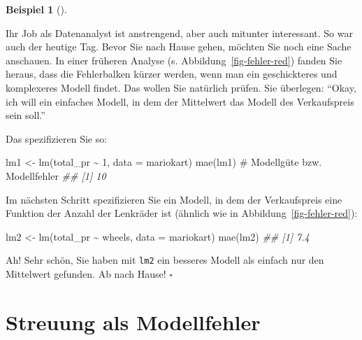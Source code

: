 \documentclass[
  letterpaper,
  twoside,
  open=any]{scrbook}
\newenvironment{Shaded}{\begin{snugshade}}{\end{snugshade}}
\newcommand{\AttributeTok}[1]{\textcolor[rgb]{0.40,0.45,0.13}{#1}}
\newcommand{\CommentTok}[1]{\textcolor[rgb]{0.37,0.37,0.37}{#1}}
\newcommand{\DecValTok}[1]{\textcolor[rgb]{0.68,0.00,0.00}{#1}}
\newcommand{\DocumentationTok}[1]{\textcolor[rgb]{0.37,0.37,0.37}{\textit{#1}}}
\newcommand{\FunctionTok}[1]{\textcolor[rgb]{0.28,0.35,0.67}{#1}}
\newcommand{\NormalTok}[1]{\textcolor[rgb]{0.00,0.23,0.31}{#1}}
\newcommand{\OtherTok}[1]{\textcolor[rgb]{0.00,0.23,0.31}{#1}}
\newcommand{\SpecialCharTok}[1]{\textcolor[rgb]{0.37,0.37,0.37}{#1}}
\theoremstyle{definition}
\theoremstyle{definition}
\theoremstyle{definition}
\newtheorem{example}{Beispiel}[chapter]
\theoremstyle{remark}
\begin{document}
\begin{example}[]\protect\hypertarget{exm-gruppen-mw}{}\label{exm-gruppen-mw}

Ihr Job als Datenanalyst ist anstrengend, aber auch mitunter
interessant. So war auch der heutige Tag. Bevor Sie nach Hause gehen,
möchten Sie noch eine Sache anschauen. In einer früheren Analyse (s.
Abbildung~\ref{fig-fehler-red}) fanden Sie heraus, dass die Fehlerbalken
kürzer werden, wenn man ein geschickteres und komplexeres Modell findet.
Das wollen Sie natürlich prüfen. Sie überlegen: \enquote{Okay, ich will
ein einfaches Modell, in dem der Mittelwert das Modell des Verkaufspreis
sein soll.}

Das spezifizieren Sie so:

\begin{Shaded}
\begin{Highlighting}[]
\NormalTok{lm1 }\OtherTok{\textless{}{-}} \FunctionTok{lm}\NormalTok{(total\_pr }\SpecialCharTok{\textasciitilde{}} \DecValTok{1}\NormalTok{, }\AttributeTok{data =}\NormalTok{ mariokart)}
\FunctionTok{mae}\NormalTok{(lm1)  }\CommentTok{\# Modellgüte bzw. Modellfehler}
\DocumentationTok{\#\# [1] 10}
\end{Highlighting}
\end{Shaded}

Im nächsten Schritt spezifizieren Sie ein Modell, in dem der
Verkaufspreis eine Funktion der Anzahl der Lenkräder ist (ähnlich wie in
Abbildung~\ref{fig-fehler-red}):

\begin{Shaded}
\begin{Highlighting}[]
\NormalTok{lm2 }\OtherTok{\textless{}{-}} \FunctionTok{lm}\NormalTok{(total\_pr }\SpecialCharTok{\textasciitilde{}}\NormalTok{ wheels, }\AttributeTok{data =}\NormalTok{ mariokart)}
\FunctionTok{mae}\NormalTok{(lm2)}
\DocumentationTok{\#\# [1] 7.4}
\end{Highlighting}
\end{Shaded}

Ah! Sehr schön, Sie haben mit \texttt{lm2} ein besseres Modell als
einfach nur den Mittelwert gefunden. Ab nach Hause! \(\square\)

\end{example}

\section{Streuung als Modellfehler}\label{streuung-als-modellfehler}
\end{document}
